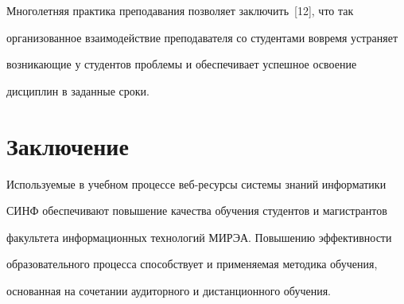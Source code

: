   Многолетняя практика преподавания позволяет заключить~[12], что так


организованное взаимодействие преподавателя со студентами вовремя устраняет


возникающие у студентов проблемы и обеспечивает успешное освоение


дис\-цип\-лин в заданные сроки.










\section{Заключение}





  Используемые в учебном процессе веб-ресурсы системы знаний информатики


СИНФ обеспечивают повышение качества обучения студентов и магистрантов


факультета информационных технологий МИРЭА. Повышению эффек\-тив\-ности


образовательного процесса способствует и применяемая методика обуче\-ния,


основанная на сочетании аудиторного и дистанционного обучения.










